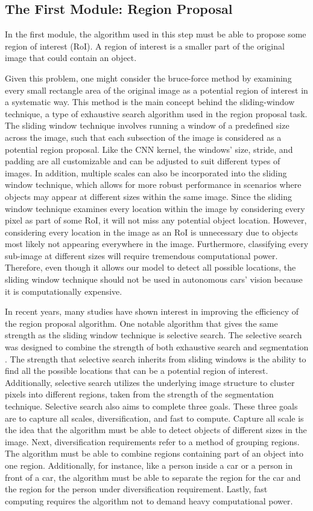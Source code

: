 \subsection{The First Module: Region Proposal}
In the first module, the algorithm used in this step must be able to propose some region of interest (RoI). A region of interest is a smaller part of the original image that could contain an object.

Given this problem, one might consider the bruce-force method by examining every small rectangle area of the original image as a potential region of interest in a systematic way. This method is the main concept behind the sliding-window technique, a type of exhaustive search algorithm used in the region proposal task. The sliding window technique involves running a window of a predefined size across the image, such that each subsection of the image is considered as a potential region proposal. Like the CNN kernel, the windows' size, stride, and padding are all customizable and can be adjusted to suit different types of images. In addition, multiple scales can also be incorporated into the sliding window technique, which allows for more robust performance in scenarios where objects may appear at different sizes within the same image. Since the sliding window technique examines every location within the image by considering every pixel as part of some RoI, it will not miss any potential object location. However, considering every location in the image as an RoI is unnecessary due to objects most likely not appearing everywhere in the image. Furthermore, classifying every sub-image at different sizes will require tremendous computational power. Therefore, even though it allows our model to detect all possible locations, the sliding window technique should not be used in autonomous cars' vision because it is computationally expensive.

In recent years, many studies have shown interest in improving the efficiency of the region proposal algorithm. One notable algorithm that gives the same strength as the sliding window technique is selective search. The selective search was designed to combine the strength of both exhaustive search and segmentation \cite{selective_search_2013}. The strength that selective search inherits from sliding windows is the ability to find all the possible locations that can be a potential region of interest. Additionally, selective search utilizes the underlying image structure to cluster pixels into different regions, taken from the strength of the segmentation technique. Selective search also aims to complete three goals. These three goals are to capture all scales, diversiﬁcation, and fast to compute. Capture all scale is the idea that the algorithm must be able to detect objects of different sizes in the image. Next, diversiﬁcation requirements refer to a method of grouping regions. The algorithm must be able to combine regions containing part of an object into one region. Additionally, for instance, like a person inside a car or a person in front of a car, the algorithm must be able to separate the region for the car and the region for the person under diversiﬁcation requirement. Lastly, fast computing requires the algorithm not to demand heavy computational power.

